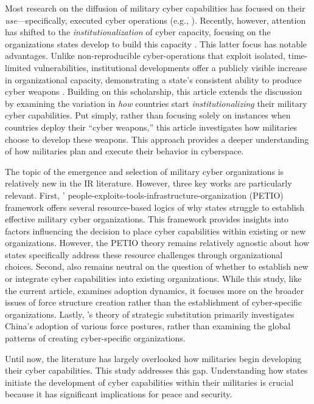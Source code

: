 \documentclass[12pt, letterpaper]{article}
\theoremstyle{plain}
\theoremstyle{remark}
\begin{document}
Most research on the diffusion of military cyber capabilities has focused on their \textit{use}---specifically, executed cyber operations (e.g., \citealt{valeriano2018cyber}). Recently, however, attention has shifted to the \textit{institutionalization} of cyber capacity, focusing on the organizations states develop to build this capacity \citep{Kostyuk2024JPR}. This latter focus has notable advantages. 
Unlike non-reproducible cyber-operations that exploit isolated, time-limited vulnerabilities, institutional developments offer a publicly visible increase in organizational capacity, demonstrating a state’s consistent ability to produce cyber weapons \citep{Kostyuk2021ISQ}. Building on this scholarship, this article extends the discussion by examining the variation in \textit{how} countries start \textit{institutionalizing} their military cyber capabilities. Put simply, rather than focusing solely on instances when countries deploy their ``cyber weapons,'' this article investigates how militaries choose to develop these weapons. 
This approach provides a deeper understanding of how militaries plan and execute their behavior in cyberspace.


The topic of the emergence and selection of military cyber organizations is relatively new in the IR literature. However, three key works are particularly relevant. First, \citet{Smeets2022SS}' people-exploits-tools-infrastructure-organization (PETIO) framework offers several resource-based logics of why states struggle to establish effective military cyber organizations. This framework provides insights into factors influencing the decision to place cyber capabilities within existing or new organizations. However, the PETIO theory remains relatively agnostic about how states specifically address these resource challenges through organizational choices. Second, \citet{Blessing2020} also remains neutral on the question of whether to establish new or integrate cyber capabilities into existing organizations. While this study, like the current article, examines adoption dynamics, it focuses more on the broader issues of force structure creation rather than the establishment of cyber-specific organizations. Lastly, \citet{Cunningham2022IS}'s theory of strategic substitution primarily investigates China’s adoption of various force postures, rather than examining the global patterns of creating cyber-specific organizations.


Until now, the literature has largely overlooked how militaries begin developing their cyber capabilities. This study addresses this gap. Understanding how states initiate the development of cyber capabilities within their militaries is crucial because it has significant implications for peace and security. 
\end{document}
